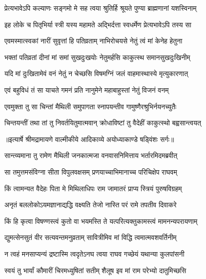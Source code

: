 \twolineshloka
{प्रेत्यभावेऽपि कल्याणः सङ्गमो मे सह त्वया}
{श्रुतिर्हि श्रूयते पुण्या ब्राह्मणानां यशस्विनाम्} %

\twolineshloka
{इह लोके च पितृभिर्या स्त्री यस्य महामते}
{अद्भिर्दत्ता स्वधर्मेण प्रेत्यभावेऽपि तस्य सा} %

\twolineshloka
{एवमस्मात्स्वकां नारीं सुवृत्तां हि पतिव्रताम्}
{नाभिरोचयसे नेतुं त्वं मां केनेह हेतुना} %

\twolineshloka
{भक्तां पतिव्रतां दीनां मां समां सुखदुःखयोः}
{नेतुमर्हसि काकुत्स्थ समानसुखदुःखिनीम्} %

\twolineshloka
{यदि मां दुःखितामेवं वनं नेतुं न चेच्छसि}
{विषमग्निं जलं वाहमास्थास्ये मृत्युकारणात्} %

\twolineshloka
{एवं बहुविधं तं सा याचते गमनं प्रति}
{नानुमेने महाबाहुस्तां नेतुं विजनं वनम्} %

\twolineshloka
{एवमुक्ता तु सा चिन्तां मैथिली समुपागता}
{स्नापयन्तीव गामुष्णैरश्रुभिर्नयनच्युतैः} %

\twolineshloka
{चिन्तयन्तीं तथा तां तु निवर्तयितुमात्मवान्}
{क्रोधाविष्टां तु वैदेहीं काकुत्स्थो बह्वसान्त्वयत्} %


{॥इत्यार्षे श्रीमद्रामायणे वाल्मीकीये आदिकाव्ये अयोध्याकाण्डे षड्विंशः सर्गः॥}


\twolineshloka
{सान्त्व्यमाना तु रामेण मैथिली जनकात्मजा}
{वनवासनिमित्ताय भर्तारमिदमब्रवीत्} %

\twolineshloka
{सा तमुत्तमसंविग्ना सीता विपुलवक्षसम्}
{प्रणयाच्चाभिमानाच्च परिचिक्षेप राघवम्} %

\twolineshloka
{किं त्वामन्यत वैदेहः पिता मे मिथिलाधिपः}
{राम जामातरं प्राप्य स्त्रियं पुरुषविग्रहम्} %

\twolineshloka
{अनृतं बललोकोऽयमज्ञानाद्यद्धि वक्ष्यति}
{तेजो नास्ति परं रामे तपतीव दिवाकरे} %

\twolineshloka
{किं हि कृत्वा विषण्णस्त्वं कुतो वा भयमस्ति ते}
{यत्परित्यक्तुकामस्त्वं मामनन्यपरायणाम्} %

\twolineshloka
{द्युमत्सेनसुतं वीर सत्यवन्तमनुव्रताम्}
{सावित्रीमिव मां विद्धि त्वमात्मवशवर्तिनीम्} %

\twolineshloka
{न त्वहं मनसाप्यन्यं द्रष्टास्मि त्वदृतेऽनघ}
{त्वया राघव गच्छेयं यथान्या कुलपांसनी} %

\twolineshloka
{स्वयं तु भार्यां कौमारीं चिरमध्युषितां सतीम्}
{शैलूष इव मां राम परेभ्यो दातुमिच्छसि} %

